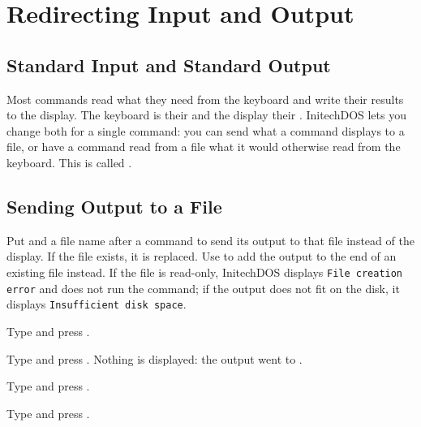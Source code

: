 \chapter{Redirecting Input and Output}

\section{Standard Input and Standard Output}
Most commands read what they need from the keyboard and write their results
to the display.  The keyboard is their  and the
display their .  InitechDOS lets you change both for
a single command: you can send what a command displays to a file, or have a
command read from a file what it would otherwise read from the keyboard.
This is called .

\section{Sending Output to a File}
Put \type{>} and a file name after a command to send its output to that file
instead of the display.  If the file exists, it is replaced.  Use \type{>>}
to add the output to the end of an existing file instead.  If the file is
read-only, InitechDOS displays \texttt{File creation error} and does not run
the command; if the output does not fit on the disk, it displays
\texttt{Insufficient disk space}.
\begin{Steps}
\item Type  and press .
\item Type  and press .  Nothing is
  displayed: the output went to .
\item Type  and press .
\item Type  and press .
\end{Steps}

